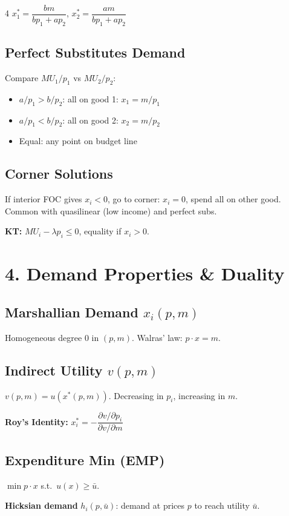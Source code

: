 \documentclass[8pt,landscape]{extarticle}
\newcommand{\HI}[1]{\colorbox{yellow!30}{#1}}
\begin{document}
\begin{multicols}{4}
\HI{$x_1^* = \dfrac{bm}{bp_1 + ap_2}$}, \quad $x_2^* = \dfrac{am}{bp_1 + ap_2}$

\subsection{Perfect Substitutes Demand}
Compare $MU_1/p_1$ vs $MU_2/p_2$:
\begin{itemize}
\item $a/p_1 > b/p_2$: all on good 1: $x_1=m/p_1$
\item $a/p_1 < b/p_2$: all on good 2: $x_2=m/p_2$
\item Equal: any point on budget line
\end{itemize}

\subsection{Corner Solutions}
If interior FOC gives $x_i < 0$, go to corner: $x_i = 0$, spend all on other good. Common with quasilinear (low income) and perfect subs.

\textbf{KT:} $MU_i - \lambda p_i \leq 0$, equality if $x_i > 0$.

\section{4. Demand Properties \& Duality}

\subsection{Marshallian Demand $x_i(p,m)$}
Homogeneous degree 0 in $(p,m)$. Walras' law: $p\cdot x = m$.

\subsection{Indirect Utility $v(p,m)$}
$v(p,m) = u(x^*(p,m))$. Decreasing in $p_i$, increasing in $m$.

\textbf{Roy's Identity:} $x_i^* = -\dfrac{\partial v/\partial p_i}{\partial v/\partial m}$

\subsection{Expenditure Min (EMP)}
$\min p\cdot x$ s.t.\ $u(x)\geq \bar{u}$.

\HI{\textbf{Hicksian demand}} $h_i(p,\bar{u})$: demand at prices $p$ to reach utility $\bar{u}$.


\end{multicols}
\end{document}
